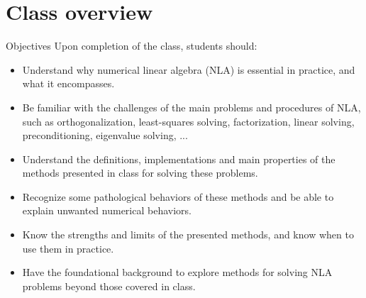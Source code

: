\documentclass[t,usepdftitle=false]{beamer}
\begin{document}
\section{Class overview}

\begin{frame}{Objectives}
Upon completion of the class, students should:
\begin{itemize}
\item Understand why numerical linear algebra (NLA) is essential in practice, and what it encompasses.
\item Be familiar with the challenges of the main problems and procedures of NLA, such as orthogonalization, least-squares solving, factorization, linear solving, preconditioning, eigenvalue solving, ...
\item Understand the definitions, implementations and main properties of the methods presented in class for solving these problems.
\item Recognize some pathological behaviors of these methods and be able to explain unwanted numerical behaviors.
\item Know the strengths and limits of the presented methods, and know when to use them in practice.
\item Have the foundational background to explore methods for solving NLA problems beyond those covered in class.
\end{itemize}
\end{frame}
\end{document}
